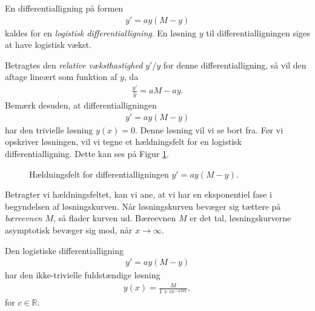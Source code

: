 \begin{defn}
	En differentialligning på formen 
	\begin{align*}
		y' = ay(M-y)
	\end{align*}
	kaldes for en \textit{logistisk differentialligning}. En løsning $y$ til differentialligningen siges at have logistisk vækst. 
\end{defn}
Betragtes den \textit{relative væksthastighed} $y'/y$ for denne differentialligning, så vil den aftage lineært som funktion af $y$, da
\begin{align*}
	\frac{y'}{y} = aM - ay.
\end{align*}
Bemærk desuden, at differentialligningen
\begin{align*}
	y' = ay(M-y)
\end{align*}
har den trivielle løsning $y(x) = 0$. Denne løsning vil vi se bort fra. Før vi opskriver løsningen, vil vi tegne et hældningsfelt for en logistisk differentialligning. Dette kan ses på Figur \ref{fig:loghæld}.
\begin{figure}[H]
	\centering
	\caption{Hældningsfelt for differentialligningen $y' = ay(M - y)$.}
	\label{fig:loghæld}
\end{figure}
Betragter vi hældningsfeltet, kan vi ane, at vi har en eksponentiel fase i begyndelsen af løsningskurven. Når løsningskurven bevæger sig tættere på \textit{bæreevnen} $M$, så flader kurven ud. Bæreevnen $M$ er det tal, løsningskurverne asymptotisk bevæger sig mod, når $x \to \infty$. 
\begin{setn}
	Den logistiske differentialligning
	\begin{align*}
		y' = ay(M-y)
	\end{align*}
	har den ikke-trivielle fuldstændige løsning
	\begin{align*}
		y(x) = \frac{M}{1+ce^{-aMx}},
	\end{align*}
	for $c\in \mathbb{R}$. 
\end{setn}
